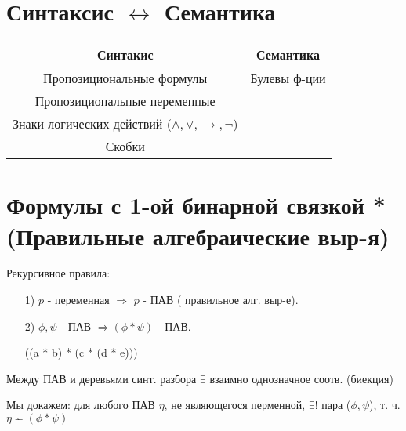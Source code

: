 \section{Синтаксис $\leftrightarrow$ Семантика}
\begin{center}
\begin{tabular}{ |c|c| }
 \hline
 Синтакис & Семантика \\
 \hline
 Пропозициональные формулы & Булевы ф-ции \\
 Пропозициональные переменные & \\
 Знаки логических действий ($\land, \lor, \rightarrow, \neg$)& \\
 Скобки & \\
 \hline
\end{tabular}
\end{center}

\section{Формулы с 1-ой бинарной связкой * \\ (Правильные алгебраические выр-я)}

Рекурсивное правила:
\begin{enumerate}
    \item [1) ] $p$ - переменная $\Rightarrow$ $p$ - ПАВ ( правильное алг. выр-е).
    \item [2) ] $\phi, \psi$ - ПАВ $\Rightarrow (\phi * \psi)$ - ПАВ.
        \begin{example}
            ((a * b) * (c * (d * e)))
        \end{example}
\end{enumerate}

\begin{theorem}
Между ПАВ и деревьями синт. разбора $\exists $ взаимно однозначное соотв. (биекция)
\end{theorem}

Мы докажем: для любого ПАВ $\eta$, не являющегося перменной, $\exists! $ пара ($\phi, \psi$), т. ч. $\eta \eqcirc (\phi * \psi)$

